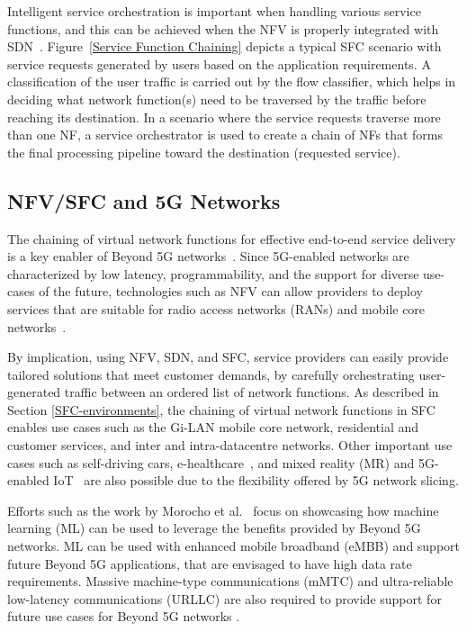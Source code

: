 \documentclass[futureinternet,review,accept,pdftex,moreauthors]{Definitions/mdpi}
\begin{document}
Intelligent service orchestration is important when handling various service functions, and this can be achieved when the NFV is properly integrated with SDN~\cite{li2015software}. \mbox{Figure \ref{Service Function Chaining}} depicts a typical SFC scenario with service requests generated by users based on the application requirements. A classification of the user traffic is carried out by the flow classifier, which helps in deciding what network function(s) need to be traversed by the traffic before reaching its destination. In a scenario where the service requests traverse more than one NF, a service orchestrator is used to create a chain of NFs that forms the final processing pipeline toward the destination (requested service). 

\subsection{NFV/SFC and 5G Networks}
\label{5G-Networks}

The chaining of virtual network functions for effective end-to-end service delivery is a key enabler of Beyond 5G networks~\cite{yousaf2017nfv, kak2021towards}. Since 5G-enabled networks are characterized by low latency, programmability, and the support for diverse use-cases of the future, technologies such as NFV can allow providers to deploy services that are suitable for radio access networks (RANs) and mobile core networks~\cite{yousaf2017nfv}.

By implication, using NFV, SDN, and SFC, service providers can easily provide tailored solutions that meet customer demands, by carefully orchestrating user-generated traffic between an ordered list of network functions. As described in Section \ref{SFC-environments}, the chaining of virtual network functions in SFC enables use cases such as the Gi-LAN mobile core network, residential and customer services, and inter and intra-datacentre networks. Other important use cases such as self-driving cars, e-healthcare~\cite{qadri2020future}, and mixed reality (MR) and 5G-enabled IoT~\cite{huang2020effective, qadri2020future} are also possible due to the flexibility offered by 5G network slicing.

Efforts such as the work by Morocho {et al.}~\cite{morocho2019machine} focus on showcasing how machine learning (ML) can be used to leverage the benefits provided by Beyond 5G networks.  ML can be used with enhanced mobile broadband (eMBB) and support future Beyond 5G applications, that are envisaged to have high data rate requirements.  Massive machine-type communications (mMTC) and ultra-reliable low-latency communications (URLLC) are also required to provide support for future use cases for Beyond 5G networks 
\cite{berardinelli2018beyond, katz20186genesis}. 
\end{document}
